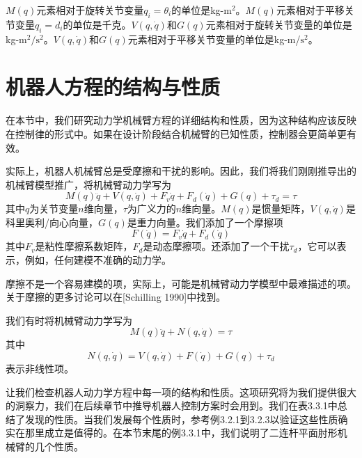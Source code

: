 \documentclass[12pt,a4paper]{ctexart}
\begin{document}
$M(q)$元素相对于旋转关节变量$q_i = \theta_i$的单位是kg-$\text{m}^2$。$M(q)$元素相对于平移关节变量$q_i = d_i$的单位是千克。$V(q,\dot{q})$和$G(q)$元素相对于旋转关节变量的单位是kg-$\text{m}^2/\text{s}^2$。$V(q,\dot{q})$和$G(q)$元素相对于平移关节变量的单位是kg-m/$\text{s}^2$。

\section{机器人方程的结构与性质}

在本节中，我们研究动力学机械臂方程的详细结构和性质，因为这种结构应该反映在控制律的形式中。如果在设计阶段结合机械臂的已知性质，控制器会更简单更有效。

实际上，机器人机械臂总是受摩擦和干扰的影响。因此，我们将我们刚刚推导出的机械臂模型推广，将机械臂动力学写为
\begin{equation}
M(q)\ddot{q} + V(q,\dot{q}) + F_v\dot{q} + F_d(\dot{q}) + G(q) + \tau_d = \tau
\end{equation}
其中$q$为关节变量$n$维向量，$\tau$为广义力的$n$维向量。$M(q)$是惯量矩阵，$V(q,\dot{q})$是科里奥利/向心向量，$G(q)$是重力向量。我们添加了一个摩擦项
\begin{equation}
F(\dot{q}) = F_v\dot{q} + F_d(\dot{q})
\end{equation}
其中$F_v$是粘性摩擦系数矩阵，$F_d$是动态摩擦项。还添加了一个干扰$\tau_d$，它可以表示，例如，任何建模不准确的动力学。

摩擦不是一个容易建模的项，实际上，可能是机械臂动力学模型中最难描述的项。关于摩擦的更多讨论可以在[Schilling 1990]中找到。

我们有时将机械臂动力学写为
\begin{equation}
M(q)\ddot{q} + N(q,\dot{q}) = \tau
\end{equation}
其中
\begin{equation}
N(q,\dot{q}) = V(q,\dot{q}) + F(\dot{q}) + G(q) + \tau_d
\end{equation}
表示非线性项。

让我们检查机器人动力学方程中每一项的结构和性质。这项研究将为我们提供很大的洞察力，我们在后续章节中推导机器人控制方案时会用到。我们在表3.3.1中总结了发现的性质。当我们发展每个性质时，参考例3.2.1到3.2.3以验证这些性质确实在那里成立是值得的。在本节末尾的例3.3.1中，我们说明了二连杆平面肘形机械臂的几个性质。
\end{document}
